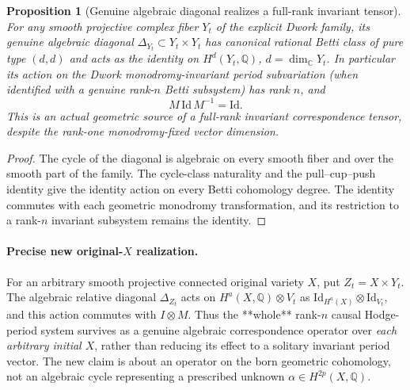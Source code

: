 \documentclass[11pt]{article}
\newtheorem{proposition}{Proposition}
\begin{document}
\begin{proposition}[Genuine algebraic diagonal realizes a full-rank invariant tensor]
For any smooth projective complex fiber $Y_t$ of the
explicit Dwork family, its genuine algebraic diagonal
$\Delta_{Y_t}\subset Y_t\times Y_t$ has canonical rational
Betti class of pure type $(d,d)$ and acts as the identity
on $H^d(Y_t,\mathbb Q)$, $d=\dim_{\mathbb C}Y_t$.
In particular its action on the Dwork monodromy-invariant
period subvariation (when identified with a genuine rank-$n$
Betti subsystem) has rank $n$, and
\[
        M\,\mathrm{Id}\,M^{-1}=\mathrm{Id}.
\tag{C2}
\]
This is an actual geometric source of a full-rank
\emph{invariant correspondence tensor}, despite the
rank-one monodromy-fixed \emph{vector} dimension.
\end{proposition}
\begin{proof}
The cycle of the diagonal is algebraic on every smooth
fiber and over the smooth part of the family. The
cycle-class naturality and the pull--cup--push identity
give the identity action on every Betti cohomology degree.
The identity commutes with each geometric monodromy
transformation, and its restriction to a rank-$n$
invariant subsystem remains the identity.
\end{proof}

\paragraph{Precise new original-$X$ realization.}
For an arbitrary smooth projective connected original variety $X$,
put $Z_t=X\times Y_t$.  The algebraic relative
diagonal $\Delta_{Z_t}$ acts on
$H^a(X,\mathbb Q)\otimes V_t$ as
$\mathrm{Id}_{H^a(X)}\otimes\mathrm{Id}_{V_t}$,
and this action commutes with $I\otimes M$.
Thus the **whole** rank-$n$ causal Hodge-period system
survives as a genuine algebraic correspondence operator
over \emph{each arbitrary initial $X$}, rather than
reducing its effect to a solitary invariant period vector.
The new claim is about an operator on the born geometric
cohomology, not an algebraic cycle representing a
prescribed unknown $\alpha\in H^{2p}(X,\mathbb Q)$.
\end{document}

